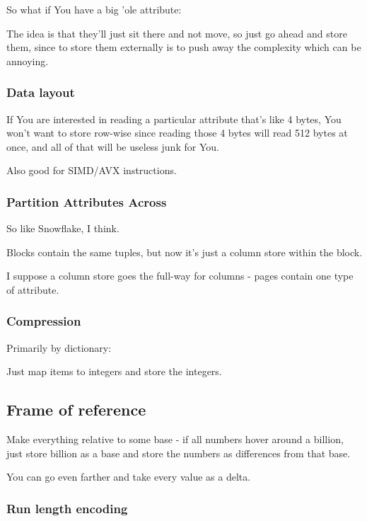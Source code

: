 \documentclass{article}
\begin{document}
				So what if You have a big 'ole attribute:
				
				The idea is that they'll just sit there and not move, so just go ahead and store them, since to store them externally is to push away the complexity which can be annoying.
				
			\subsubsection{Data layout}
			
				If You are interested in reading a particular attribute that's like 4 bytes, You won't want to store row-wise since reading those 4 bytes will read 512 bytes at once, and all of that will be useless junk for You.
				
				Also good for SIMD/AVX instructions.
				
			\subsubsection{Partition Attributes Across}
			
				So like Snowflake, I think.
				
				Blocks contain the same tuples, but now it's just a column store within the block.
				
				I suppose a column store goes the full-way for columns - pages contain one type of attribute.
				
			\subsubsection{Compression}
			
				Primarily by dictionary:
				
				Just map items to integers and store the integers.
				
			\subsection{Frame of reference}
			
				Make everything relative to some base - if all numbers hover around a billion, just store billion as a base and store the numbers as differences from that base.
				
				You can go even farther and take every value as a delta.
				
			\subsubsection{Run length encoding}
			
\end{document}
